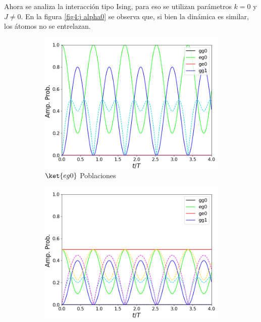 Ahora se analiza la interacción tipo Ising, para eso se utilizan parámetros $k=0$ y $J\neq 0$. En la figura \ref{fig4:j alpha0} se observa que, si bien la dinámica es similar, los átomos no se entrelazan.

\begin{figure}[H]
    \centering
    \begin{subfigure}{0.49\textwidth}
        \includegraphics[width=\textwidth]{figuras/ch4/j eg0 abc.png}
        \caption{$\ket{eg0}$ Poblaciones}
        \label{fig4:pob j eg0}
    \end{subfigure}
    \hfill
    \begin{subfigure}{0.49\textwidth}
        \includegraphics[width=\textwidth]{figuras/ch4/j eg0+ge0 abc.png}

\end{subfigure}
\end{figure}
